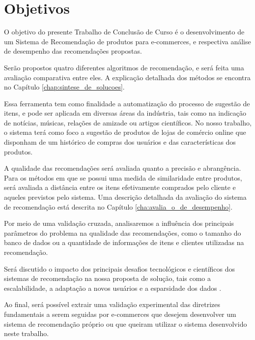 \chapter[Objetivos]{Objetivos}
\label{chap:objetivos}

O objetivo do presente Trabalho de Conclusão de Curso é o desenvolvimento de um Sistema de Recomendação de produtos para e-commerces, e respectiva análise de desempenho das recomendações propostas. 

Serão propostos quatro diferentes algoritmos de recomendação, e será feita uma avaliação comparativa entre eles. A explicação detalhada dos métodos se encontra no Capítulo \ref{chap:sintese_de_solucoes}.

Essa ferramenta tem como finalidade a automatização do processo de sugestão de itens, e pode ser aplicada em diversas áreas da indústria, tais como na indicação de notícias, músicas, relações de amizade ou artigos científicos. No nosso trabalho, o sistema terá como foco a sugestão de produtos de lojas de comércio online que disponham de um histórico de compras dos usuários e das características dos produtos.

A qualidade das recomendações será avaliada quanto a precisão e abrangência. Para os métodos em que se possui uma medida de similaridade entre produtos, será avaliada a distância entre os itens efetivamente comprados pelo cliente e aqueles previstos pelo sistema. Uma descrição detalhada da avaliação do sistema de recomendação está descrita no Capítulo \ref{cha:avalia_o_de_desempenho}.

Por meio de uma validação cruzada, analisaremos a influência dos principais parâmetros do problema na qualidade das recomendações, como o tamanho do banco de dados ou a quantidade de informações de itens e clientes utilizadas na recomendação.

Será discutido o impacto dos principais desafios tecnológicos e científicos dos sistemas de recomendação na nossa proposta de solução, tais como a escalabilidade, a adaptação a novos usuários e a esparsidade dos dados \cite{sarwar2000analysis}.

Ao final, será possível extrair uma validação experimental das diretrizes fundamentais a serem seguidas por e-commerces que desejem desenvolver um sistema de recomendação próprio ou que queiram utilizar o sistema desenvolvido neste trabalho. 